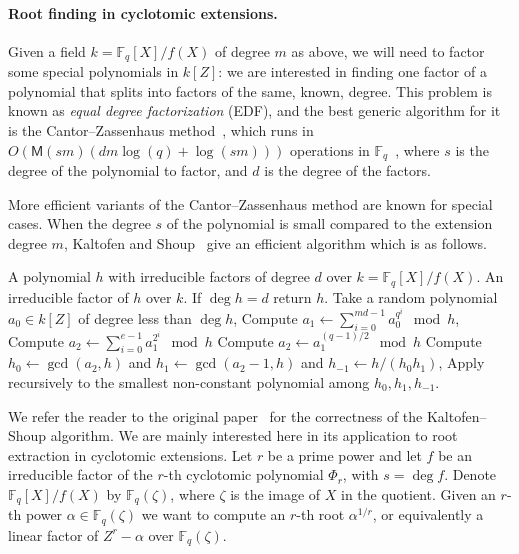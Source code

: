 \documentclass{mcom-l}
\theoremstyle{plain}
\theoremstyle{definition}
\newcommand{\F}{\ensuremath{\mathbb{F}}}
\newcommand{\MM}{\ensuremath{\mathsf{M}}}
\newcounter{algorithm}
\begin{document}
\paragraph{\bf Root finding in cyclotomic extensions.}
Given a field $k = \F_q[X]/f(X)$ of degree $m$ as above, we will need
to factor some special polynomials in $k[Z]$: we are interested in
finding one factor of a polynomial that splits into factors of the
same, known, degree. This problem is known as \emph{equal degree
  factorization} (EDF), and the best generic algorithm for it is the
Cantor--Zassenhaus method~\cite{cantor1981,von1992computing}, which
runs in $O(\MM(sm)(dm\log(q) + \log(sm)))$ operations in
$\F_q$~\cite[Th.~14.9]{vzGG}, where $s$ is the degree of the
polynomial to factor, and $d$ is the degree of the factors.

More efficient variants of the Cantor--Zassenhaus method are known for
special cases. When the degree $s$ of the polynomial is small compared
to the extension degree $m$, Kaltofen and Shoup~\cite{kaltofen+shoup97} 
give an efficient algorithm which is as follows.

\begin{algorithm}
	\label{alg:ks}
	\begin{algorithmic}[1]
		\REQUIRE A polynomial $h$  with irreducible factors of degree $d$ over $k=\F_q[X]/f(X)$.
		\ENSURE An irreducible factor of $h$ over $k$.
		\STATE If $\deg h = d$ return $h$.
		\STATE Take a random polynomial $a_0\in k[Z]$ of degree less than $\deg h$,
		\STATE\label{alg:ks-pseudotrace} Compute $\displaystyle a_1 
		\leftarrow \sum_{i=0}^{md-1} a_0^{q^i} \mod h$,
		\STATE\label{alg:ks:even} Compute $\displaystyle a_2 \leftarrow 
		\sum_{i=0}^{e-1} a_1^{2^i}\mod h$
		\ELSE
		\STATE\label{alg:ks:odd} Compute $a_2 \leftarrow a_1^{(q-1)/2}\mod h$
		\ENDIF
		\STATE\label{alg:ks:gcd} Compute $h_0\leftarrow\gcd(a_2,h)$ and 
		$h_1\leftarrow\gcd(a_2-1,h)$ and $h_{-1}\leftarrow h/(h_0h_1)$,
		\STATE Apply recursively to the smallest non-constant polynomial among 
		$h_0,h_1,h_{-1}$.
	\end{algorithmic}
\end{algorithm}


We refer the reader to the original paper~\cite{kaltofen+shoup97} for
the correctness of the Kaltofen--Shoup algorithm. We are mainly
interested here in its application to root extraction in cyclotomic
extensions. Let $r$ be a prime power and let $f$ be an irreducible
factor of the $r$-th cyclotomic polynomial $\Phi_r$, with $s = \deg
f$. Denote $\F_q[X] / f(X)$ by $\F_q(\zeta)$, where $\zeta$ is the
image of $X$ in the quotient. Given an $r$-th power $\alpha \in
\F_q(\zeta)$ we want to compute an $r$-th root $\alpha^{1 / r}$, or
equivalently a linear factor of $Z^r - \alpha$ over $\F_q(\zeta)$.
\end{document}
